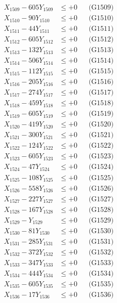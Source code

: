 \documentclass[a4paper,10pt]{article}
\begin{document}
{\begin{align}
X_{1509} - 605Y_{1509} &\leq +0 && \text{(G1509)} \\
X_{1510} - 90Y_{1510} &\leq +0 && \text{(G1510)} \\
\allowbreak
X_{1511} - 44Y_{1511} &\leq +0 && \text{(G1511)} \\
X_{1512} - 605Y_{1512} &\leq +0 && \text{(G1512)} \\
X_{1513} - 132Y_{1513} &\leq +0 && \text{(G1513)} \\
X_{1514} - 506Y_{1514} &\leq +0 && \text{(G1514)} \\
X_{1515} - 112Y_{1515} &\leq +0 && \text{(G1515)} \\
X_{1516} - 205Y_{1516} &\leq +0 && \text{(G1516)} \\
X_{1517} - 274Y_{1517} &\leq +0 && \text{(G1517)} \\
X_{1518} - 459Y_{1518} &\leq +0 && \text{(G1518)} \\
X_{1519} - 605Y_{1519} &\leq +0 && \text{(G1519)} \\
X_{1520} - 419Y_{1520} &\leq +0 && \text{(G1520)} \\
\allowbreak
X_{1521} - 300Y_{1521} &\leq +0 && \text{(G1521)} \\
X_{1522} - 124Y_{1522} &\leq +0 && \text{(G1522)} \\
X_{1523} - 605Y_{1523} &\leq +0 && \text{(G1523)} \\
X_{1524} - 47Y_{1524} &\leq +0 && \text{(G1524)} \\
X_{1525} - 108Y_{1525} &\leq +0 && \text{(G1525)} \\
X_{1526} - 558Y_{1526} &\leq +0 && \text{(G1526)} \\
X_{1527} - 227Y_{1527} &\leq +0 && \text{(G1527)} \\
X_{1528} - 167Y_{1528} &\leq +0 && \text{(G1528)} \\
X_{1529} - Y_{1529} &\leq +0 && \text{(G1529)} \\
X_{1530} - 81Y_{1530} &\leq +0 && \text{(G1530)} \\
\allowbreak
X_{1531} - 285Y_{1531} &\leq +0 && \text{(G1531)} \\
X_{1532} - 372Y_{1532} &\leq +0 && \text{(G1532)} \\
X_{1533} - 347Y_{1533} &\leq +0 && \text{(G1533)} \\
X_{1534} - 444Y_{1534} &\leq +0 && \text{(G1534)} \\
X_{1535} - 605Y_{1535} &\leq +0 && \text{(G1535)} \\
X_{1536} - 17Y_{1536} &\leq +0 && \text{(G1536)} \\

\end{align}}
\end{document}
